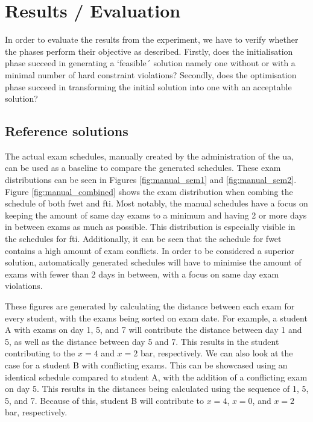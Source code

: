 
\section{Results / Evaluation}\label{sec:results}

In order to evaluate the results from the experiment, we have to verify whether the phases perform their objective as described. Firstly, does the initialisation phase succeed in generating a `feasible´ solution namely one without or with a minimal number of hard constraint violations? Secondly, does the optimisation phase succeed in transforming the initial solution into one with an acceptable solution?

\subsection{Reference solutions}

The actual exam schedules, manually created by the administration of the \acrlong{ua}, can be used as a baseline to compare the generated schedules. These exam distributions can be seen in Figures \ref{fig:manual_sem1} and \ref{fig:manual_sem2}. Figure \ref{fig:manual_combined} shows the exam distribution when combing the schedule of both \acrshort{fwet} and \acrshort{fti}. Most notably, the manual schedules have a focus on keeping the amount of same day exams to a minimum and having 2 or more days in between exams as much as possible. This distribution is especially visible in the schedules for \acrshort{fti}. Additionally, it can be seen that the schedule for \acrshort{fwet} contains a high amount of exam conflicts. In order to be considered a superior solution, automatically generated schedules will have to minimise the amount of exams with fewer than 2 days in between, with a focus on same day exam violations.

These figures are generated by calculating the distance between each exam for every student, with the exams being sorted on exam date. For example, a student A with exams on day 1, 5, and 7 will contribute the distance between day 1 and 5, as well as the distance between day 5 and 7. This results in the student contributing to the $x = 4$ and $x = 2$ bar, respectively. We can also look at the case for a student B with conflicting exams. This can be showcased using an identical schedule compared to student A, with the addition of a conflicting exam on day 5. This results in the distances being calculated using the sequence of 1, 5, 5, and 7. Because of this, student B will contribute to $x = 4$, $x = 0$, and $x = 2$ bar, respectively.

